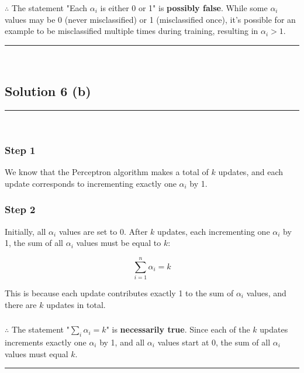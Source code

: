 \documentclass{article}
\begin{document}
\subsubsection*{\normalfont}{$\therefore$ The statement "Each $\alpha_i$ is either 0 or 1" is \textbf{possibly false}. While some $\alpha_i$ values may be 0 (never misclassified) or 1 (misclassified once), it's possible for an example to be misclassified multiple times during training, resulting in $\alpha_i > 1$.}

\noindent\rule{\textwidth}{0.4pt}\\

\newpage

\subsection*{Solution 6 (b)}
\noindent\rule{\textwidth}{0.4pt}\\

\subsubsection*{Step 1}
\parbox{\textwidth}{
We know that the Perceptron algorithm makes a total of $k$ updates, and each update corresponds to incrementing exactly one $\alpha_i$ by 1.
}

\subsubsection*{Step 2}
\parbox{\textwidth}{
Initially, all $\alpha_i$ values are set to 0. After $k$ updates, each incrementing one $\alpha_i$ by 1, the sum of all $\alpha_i$ values must be equal to $k$:

$$\sum_{i=1}^{n} \alpha_i = k$$

This is because each update contributes exactly 1 to the sum of $\alpha_i$ values, and there are $k$ updates in total.
}

\subsubsection*{\normalfont}{$\therefore$ The statement "$\sum_{i} \alpha_i = k$" is \textbf{necessarily true}. Since each of the $k$ updates increments exactly one $\alpha_i$ by 1, and all $\alpha_i$ values start at 0, the sum of all $\alpha_i$ values must equal $k$.}

\noindent\rule{\textwidth}{0.4pt}\\
\end{document}
